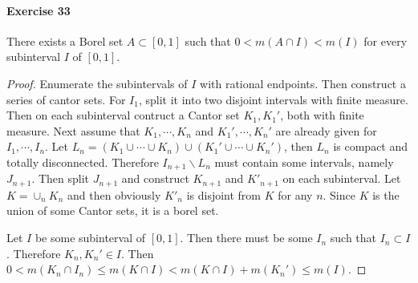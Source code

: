 \paragraph{Exercise 33}
There exists a Borel set $A\subset[0,1]$ such that $0<m(A\cap I)<m(I)$ for every subinterval $I$ of $[0,1]$.
\begin{proof}
    Enumerate the subintervals of $I$ with rational endpoints. Then construct a series of cantor sets. For $I_1$, split it into two disjoint intervals with finite measure. Then on each subinterval contruct a Cantor set $K_1,K_1'$, both with finite measure. Next assume that $K_1,\cdots,K_n$ and $K_1',\cdots,K_n'$ are already given for $I_1,\cdots,I_n$. Let $L_n=(K_1\cup\cdots\cup K_n)\cup(K_1'\cup\cdots\cup K_n')$, then $L_n$ is compact and totally disconnected. Therefore $I_{n+1}\backslash L_n$ must contain some intervals, namely $J_{n+1}$. Then split $J_{n+1}$ and construct $K_{n+1}$ and $K'_{n+1}$ on each subinterval. Let $K=\cup_n K_n$ and then obviously $K'_n$ is disjoint from $K$ for any $n$. Since $K$ is the union of some Cantor sets, it is a borel set.
    \par Let $I$ be some subinterval of $[0,1]$. Then there must be some $I_n$ such that $I_n\subset I$. Therefore $K_n,K_n'\in I$. Then $0<m(K_n\cap I_n)\le m(K\cap I)<m(K\cap I)+m(K_n')\le m(I)$.
\end{proof}
